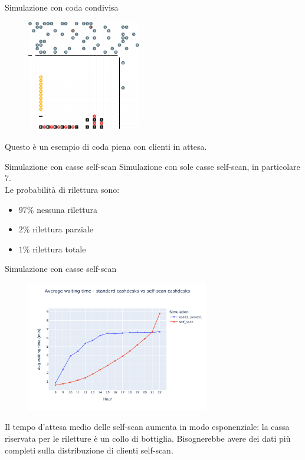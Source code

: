\begin{frame}{Simulazione con coda condivisa}
	\begin{figure}[H]
		\centering
		\includegraphics[width=5cm]{"../report/images/results/codacondivisa_screenshot.png"}
	\end{figure}
	Questo è un esempio di coda piena con clienti in attesa.
\end{frame}

\begin{frame}{Simulazione con casse self-scan}
	Simulazione con sole casse self-scan, in particolare 7. \\
	Le probabilità di rilettura sono:
	\begin{itemize}
		\item $97 \%$ nessuna rilettura
		\item $2 \%$ rilettura parziale
		\item $1 \%$ rilettura totale
	\end{itemize}
\end{frame}

\begin{frame}{Simulazione con casse self-scan}
	\begin{figure}[H]
		\centering
		\includegraphics[width=8cm]{"../report/images/results/avg_wt_selfscan.png"}
	\end{figure}
	Il tempo d'attesa medio delle self-scan aumenta in modo esponenziale: la cassa riservata per le riletture è un collo di bottiglia. Bisognerebbe avere dei dati più completi sulla distribuzione di clienti self-scan.
\end{frame}

